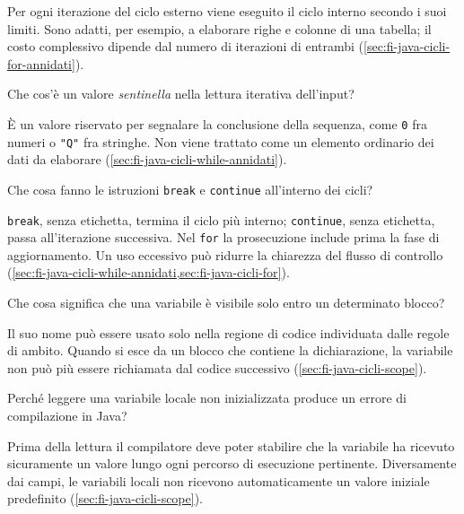 Per ogni iterazione del ciclo esterno viene eseguito il ciclo
interno secondo i suoi limiti. Sono adatti, per esempio, a
elaborare righe e colonne di una tabella; il costo complessivo
dipende dal numero di iterazioni di entrambi
(\cref{sec:fi-java-cicli-for-annidati}).

\begin{exercise}
\label{ex:fi-esercizi-java-cicli-sentinella}
Che cos'è un valore \emph{sentinella} nella lettura iterativa
dell'input?
\end{exercise}

È un valore riservato per segnalare la conclusione della sequenza,
come \texttt{0} fra numeri o \texttt{"Q"} fra stringhe.
Non viene trattato come un elemento ordinario dei dati da
elaborare
(\cref{sec:fi-java-cicli-while-annidati}).

\begin{exercise}
\label{ex:fi-esercizi-java-cicli-break-continue}
Che cosa fanno le istruzioni \texttt{break} e
\texttt{continue} all'interno dei cicli?
\end{exercise}

\texttt{break}, senza etichetta, termina il ciclo più interno;
\texttt{continue}, senza etichetta, passa all'iterazione successiva.
Nel \texttt{for} la prosecuzione include prima la fase di
aggiornamento. Un uso eccessivo può ridurre la chiarezza
del flusso di controllo
(\cref{sec:fi-java-cicli-while-annidati,sec:fi-java-cicli-for}).

\begin{exercise}
\label{ex:fi-esercizi-java-cicli-scopiazione}
Che cosa significa che una variabile è visibile solo entro
un determinato blocco?
\end{exercise}

Il suo nome può essere usato solo nella regione di codice
individuata dalle regole di ambito. Quando si esce da un blocco
che contiene la dichiarazione, la variabile non può più essere
richiamata dal codice successivo
(\cref{sec:fi-java-cicli-scope}).

\begin{exercise}
\label{ex:fi-esercizi-java-cicli-inizializzazione-locali}
Perché leggere una variabile locale non inizializzata produce
un errore di compilazione in Java?
\end{exercise}

Prima della lettura il compilatore deve poter stabilire che
la variabile ha ricevuto sicuramente un valore lungo ogni
percorso di esecuzione pertinente. Diversamente dai campi,
le variabili locali non ricevono automaticamente un valore
iniziale predefinito
(\cref{sec:fi-java-cicli-scope}).

